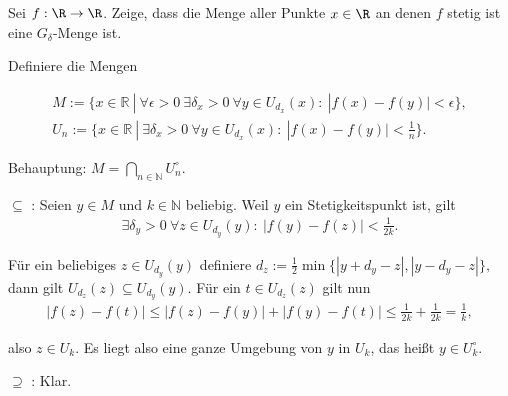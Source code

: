 \begin{exercise}
Sei $f: \R \rightarrow \R$. Zeige, dass die Menge aller Punkte $x \in \R$ an
denen $f$ stetig ist eine $G_{\delta}$-Menge ist.
\end{exercise}
\begin{solution}
  Definiere die Mengen

  \begin{align}
  M := \{x \in \mathbb{R} ~|~ \forall \epsilon > 0 ~\exists \delta_x > 0 ~\forall y \in U_{d_x}(x): ~|f(x)-f(y)| < \epsilon\}, \\
  U_n := \{x \in \mathbb{R} ~|~ \exists \delta_x > 0 ~\forall y \in U_{d_x}(x): ~|f(x)-f(y)| < \frac{1}{n}\}.
  \end{align}

  Behauptung: $M = \bigcap_{n \in \mathbb{N}} U_n^\circ.$

  \glqq $\subseteq$ \grqq: Seien $y \in M$ und $k \in \mathbb{N}$ beliebig. Weil $y$ ein Stetigkeitspunkt ist, gilt
  \begin{align}
      \exists \delta_y > 0 ~\forall z \in U_{d_y}(y): ~|f(y)-f(z)| < \frac{1}{2k}.
  \end{align}

  Für ein beliebiges $z \in U_{d_y}(y)$ definiere $d_z := \frac{1}{2} \min\{|y + d_y - z|, |y - d_y - z|\},$ dann gilt $U_{d_z}(z) \subseteq U_{d_y}(y).$ Für ein $t \in U_{d_z}(z)$ gilt nun
  \begin{align}
      |f(z)-f(t)| \leq |f(z)-f(y)| + |f(y)-f(t)| \leq \frac{1}{2k} + \frac{1}{2k} = \frac{1}{k},
  \end{align}

  also $z \in U_k$. Es liegt also eine ganze Umgebung von $y$ in $U_k$, das heißt $y \in U_k^\circ.$


  \glqq$\supseteq$ \grqq: Klar.
\end{solution}
